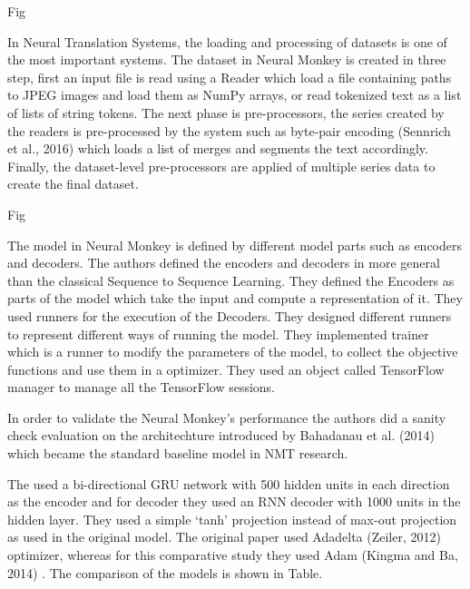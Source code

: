 Fig 








In Neural Translation Systems, the loading and processing of datasets is one of the most important systems. The dataset in Neural Monkey is created in three step, first an input file is read using a Reader which load a file containing paths to JPEG images and load them as NumPy arrays, or read tokenized text as a list of lists of string tokens. The next phase is pre-processors, the series created by the readers is pre-processed by the system such as byte-pair encoding (Sennrich et al., 2016) which loads a list of merges and segments the text accordingly. Finally, the dataset-level pre-processors are applied of multiple series data to create the final dataset. 





Fig







The model in Neural Monkey is defined by different model parts such as encoders and decoders. The authors defined the encoders and decoders in more general than the classical Sequence to Sequence Learning. They defined the Encoders as parts of the model which take the input and compute a representation of it. They used runners for the execution of the Decoders. They designed different runners to represent different ways of running the model. They implemented trainer which is a runner to modify the parameters of the model, to collect the objective functions and use them in a optimizer. They used an object called TensorFlow manager to manage all the TensorFlow sessions. 

In order to validate the Neural Monkey’s performance the authors did a sanity check evaluation on the architechture introduced by Bahadanau et al. (2014) which became the standard baseline model in NMT research. 








The used a bi-directional GRU network with 500 hidden units in each direction as the encoder and for decoder they used an RNN decoder with 1000 units in the hidden layer. They used a simple ‘tanh’ projection instead of max-out projection as used in the original model. The original paper used Adadelta (Zeiler, 2012) optimizer, whereas for this comparative study they used Adam (Kingma and Ba, 2014) . The comparison of the models is shown in Table. 

